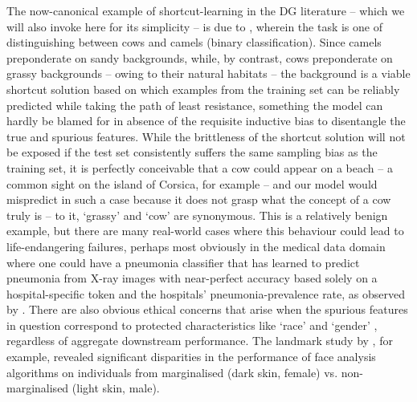 %
The now-canonical example of shortcut-learning in the \ac{DG} literature -- which we will also
invoke here for its simplicity -- is due to \cite{beery2018recognition}, wherein the task is one of
distinguishing between cows and camels (binary classification). 
%
Since camels preponderate on sandy backgrounds, while, by contrast, cows preponderate on grassy
backgrounds -- owing to their natural habitats -- the background is a viable shortcut solution
based on which examples from the training set can be reliably predicted while taking the path of
least resistance, something the model can hardly be blamed for in absence of the requisite
inductive bias to disentangle the true and spurious features.
%
While the brittleness of the shortcut solution will not be exposed if the test set consistently
suffers the same sampling bias as the training set, it is perfectly conceivable that a cow could
appear on a beach -- a common sight on the island of Corsica, for example -- and our model would
mispredict in such a case because it does not grasp what the concept of a cow truly is -- to it,
`grassy' and `cow' are synonymous.
%
This is a relatively benign example, but there are many real-world cases where this behaviour could
lead to life-endangering failures, perhaps most obviously in the medical data domain where one
could have a pneumonia classifier that has learned to predict pneumonia from X-ray images with
near-perfect accuracy based solely on a hospital-specific token and the hospitals'
pneumonia-prevalence rate, as observed by \cite{zech2018variable}.
%
There are also obvious ethical concerns that arise when the spurious features in question
correspond to protected characteristics like `race' and `gender' \citep{buolamwini2018gender,
wang2019balanced}, regardless of aggregate downstream performance. 
%
The landmark study by \cite{buolamwini2018gender}, for example, revealed significant disparities in
the performance of face analysis algorithms on individuals from marginalised (dark skin, female)
vs. non-marginalised (light skin, male).

